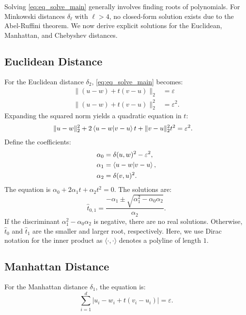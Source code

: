 Solving \cref{eq:eq_solve_main} generally involves finding roots of polynomials. For Minkowski distances \(\delta_\ell\) with \(\ell > 4\), no closed-form solution exists due to the Abel-Ruffini theorem. We now derive explicit solutions for the Euclidean, Manhattan, and Chebyshev distances.

\subsection{Euclidean Distance}
\label{ssec:eq_euclidean_distance}
For the Euclidean distance \(\delta_2\), \cref{eq:eq_solve_main} becomes:
\begin{align*}
  \| (u - w) + t(v - u) \|_2 &= \varepsilon \\
  \| (u - w) + t(v - u) \|_2^2 &= \varepsilon^2.
\end{align*}
Expanding the squared norm yields a quadratic equation in \(t\):
\begin{align*}
  \| u - w \|_2^2 + 2\braket{u - w | v - u} t + \| v - u \|_2^2 t^2 &= \varepsilon^2.
\end{align*}
Define the coefficients:
\begin{align*}
	\alpha_0 &= \delta(u,w)^2 - \varepsilon^2, \\
	\alpha_1 &= \braket{u - w | v - u}, \\
	\alpha_2 &= \delta(v, u)^2.
\end{align*}
The equation is \(\alpha_0 + 2\alpha_1 t + \alpha_2 t^2 = 0\). The solutions are:
\begin{equation}
	\hat t_{0,1} = \frac{-\alpha_1 \pm \sqrt{\alpha_1^2 - \alpha_0\alpha_2}}{\alpha_2}.\label{eq:sol_explicit_euclidean}
\end{equation}
If the discriminant \(\alpha_1^2 - \alpha_0\alpha_2\) is negative, there are no real solutions. Otherwise, \(\hat{t}_0\) and \(\hat{t}_1\) are the smaller and larger root, respectively. Here, we use Dirac notation for the inner product as \(\langle \cdot , \cdot \rangle\) denotes a polyline of length \(1\).

\subsection{Manhattan Distance}
\label{ssec:eq_manhattan_distance}
For the Manhattan distance \(\delta_1\), the equation is:
\begin{equation}
  \sum_{i=1}^d |u_i - w_i + t (v_i - u_i)| = \varepsilon. \label{eq:solve_manhattan}
\end{equation}

